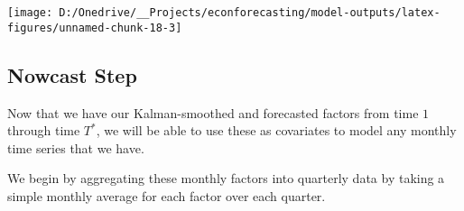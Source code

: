 \documentclass[11pt, letterpaper]{article}\usepackage[]{graphicx}\usepackage[]{color}
\begin{document}
{\centering \texttt{[image: D:/Onedrive/\_\_Projects/econforecasting/model-outputs/latex-figures/unnamed-chunk-18-3]} 

}





\subsection{Nowcast Step}
Now that we have our Kalman-smoothed and forecasted factors from time $1$ through time $T^*$, we will be able to use these as covariates to model any monthly time series that we have.

We begin by aggregating these monthly factors into quarterly data by taking a simple monthly average for each factor over each quarter.
\end{document}

